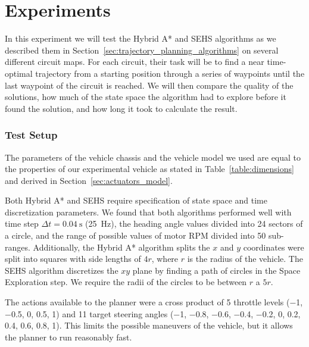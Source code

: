 \chapter{Experiments}
\label{chapter:experiments}

In this experiment we will test the Hybrid A* and \gls{SEHS} algorithms as we described them in Section~\ref{sec:trajectory_planning_algorithms} on several different circuit maps. For each circuit, their task will be to find a near time-optimal trajectory from a starting position through a series of waypoints until the last waypoint of the circuit is reached. We will then compare the quality of the solutions, how much of the state space the algorithm had to explore before it found the solution, and how long it took to calculate the result.

\subsection{Test Setup}

The parameters of the vehicle chassis and the vehicle model we used are equal to the properties of our experimental vehicle as stated in Table~\ref{table:dimensions} and derived in Section~\ref{sec:actuators_model}.

Both Hybrid A* and \gls*{SEHS} require specification of state space and time discretization parameters. We found that both algorithms performed well with time step $\Delta t=\SI{0.04}{\second}$ (\SI{25}{\hertz}), the heading angle values divided into \num{24} sectors of a circle, and the range of possible values of motor \gls*{RPM} divided into \num{50} sub-ranges. Additionally, the Hybrid A* algorithm splits the $x$ and $y$ coordinates were split into squares with side lengths of $4r$, where $r$ is the radius of the vehicle. The SEHS algorithm discretizes the $xy$ plane by finding a path of circles in the Space Exploration step. We require the radii of the circles to be between $r$ a $5r$.

The actions available to the planner were a cross product of 5 throttle levels (\num{-1}, \num{-0.5}, \num{0}, \num{0.5}, \num{1}) and 11 target steering angles (\num{-1}, \num{-0.8}, \num{-0.6}, \num{-0.4}, \num{-0.2}, \num{0}, \num{0.2}, \num{0.4}, \num{0.6}, \num{0.8}, \num{1}). This limits the possible maneuvers of the vehicle, but it allows the planner to run reasonably fast.


